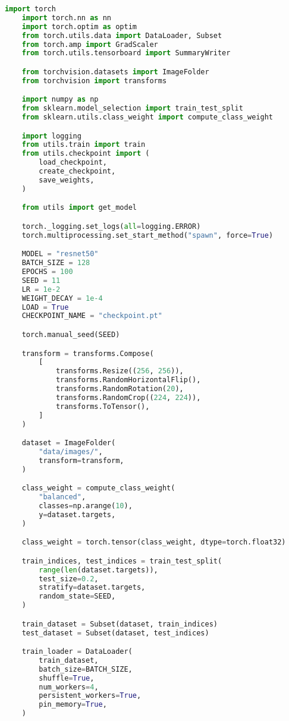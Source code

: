 \begin{lstlisting}[language=python, caption={Файл research.ipynb}, label={listing:research}]
    import torch
    import torch.nn as nn
    import torch.optim as optim
    from torch.utils.data import DataLoader, Subset
    from torch.amp import GradScaler
    from torch.utils.tensorboard import SummaryWriter

    from torchvision.datasets import ImageFolder
    from torchvision import transforms

    import numpy as np
    from sklearn.model_selection import train_test_split
    from sklearn.utils.class_weight import compute_class_weight

    import logging
    from utils.train import train
    from utils.checkpoint import (
        load_checkpoint,
        create_checkpoint,
        save_weights,
    )

    from utils import get_model

    torch._logging.set_logs(all=logging.ERROR)
    torch.multiprocessing.set_start_method("spawn", force=True)

    MODEL = "resnet50"
    BATCH_SIZE = 128
    EPOCHS = 100
    SEED = 11
    LR = 1e-2
    WEIGHT_DECAY = 1e-4
    LOAD = True
    CHECKPOINT_NAME = "checkpoint.pt"

    torch.manual_seed(SEED)

    transform = transforms.Compose(
        [
            transforms.Resize((256, 256)),
            transforms.RandomHorizontalFlip(),
            transforms.RandomRotation(20),
            transforms.RandomCrop((224, 224)),
            transforms.ToTensor(),
        ]
    )

    dataset = ImageFolder(
        "data/images/",
        transform=transform,
    )

    class_weight = compute_class_weight(
        "balanced",
        classes=np.arange(10),
        y=dataset.targets,
    )

    class_weight = torch.tensor(class_weight, dtype=torch.float32)

    train_indices, test_indices = train_test_split(
        range(len(dataset.targets)),
        test_size=0.2,
        stratify=dataset.targets,
        random_state=SEED,
    )

    train_dataset = Subset(dataset, train_indices)
    test_dataset = Subset(dataset, test_indices)

    train_loader = DataLoader(
        train_dataset,
        batch_size=BATCH_SIZE,
        shuffle=True,
        num_workers=4,
        persistent_workers=True,
        pin_memory=True,
    )


\end{lstlisting}
